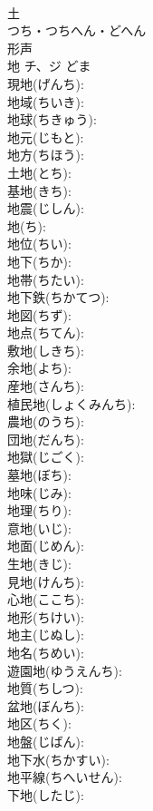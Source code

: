 \documentclass[8pt]{extreport}
\begin{document}
\begin{CJK}{UTF8}{min}
\\	土	
\\	つち・つちへん・どへん	
\\	形声 
\\	地	チ、ジ		どま	
\\	現地(げんち): 
\\	地域(ちいき): 
\\	地球(ちきゅう): 
\\	地元(じもと): 
\\	地方(ちほう): 
\\	土地(とち): 
\\	基地(きち): 
\\	地震(じしん): 
\\	地(ち): 
\\	地位(ちい): 
\\	地下(ちか): 
\\	地帯(ちたい): 
\\	地下鉄(ちかてつ): 
\\	地図(ちず): 
\\	地点(ちてん): 
\\	敷地(しきち): 
\\	余地(よち): 
\\	産地(さんち): 
\\	植民地(しょくみんち): 
\\	農地(のうち): 
\\	団地(だんち): 
\\	地獄(じごく): 
\\	墓地(ぼち): 
\\	地味(じみ): 
\\	地理(ちり): 
\\	意地(いじ): 
\\	地面(じめん): 
\\	生地(きじ): 
\\	見地(けんち): 
\\	心地(ここち): 
\\	地形(ちけい): 
\\	地主(じぬし): 
\\	地名(ちめい): 
\\	遊園地(ゆうえんち): 
\\	地質(ちしつ): 
\\	盆地(ぼんち): 
\\	地区(ちく): 
\\	地盤(じばん): 
\\	地下水(ちかすい): 
\\	地平線(ちへいせん): 
\\	下地(したじ): 

\end{CJK}
\end{document}
